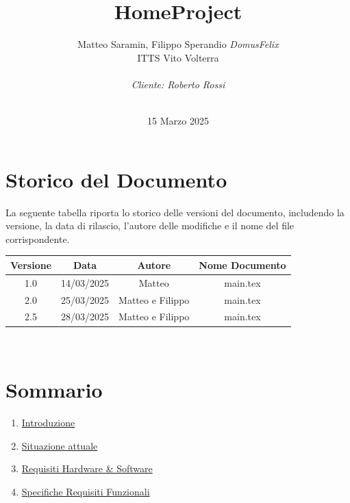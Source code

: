 \documentclass[italian, 12pt, a4paper]{article}
\title{\huge{HomeProject}}
\author{Matteo Saramin, Filippo Sperandio \textit{DomusFelix} \\ {\small ITTS Vito Volterra} \\ \\ \emph{Cliente: Roberto Rossi}}
\date{\version\\ 15 Marzo 2025}
\begin{document}
\maketitle %

\section{Storico del Documento}
La seguente tabella riporta lo storico delle versioni del documento, includendo la versione, la data di rilascio, l'autore delle modifiche e il nome del file corrispondente.

\begin{center}
    \renewcommand{\arraystretch}{1.5} %
    \begin{tabular}{|c|c|c|c|}
        \hline
        \rowcolor{violet!30}
        Versione & Data & Autore & Nome Documento \\
        \hline
        1.0 & 14/03/2025 & Matteo & main.tex \\
        \hline
        2.0&25/03/2025&Matteo e Filippo & main.tex \\
        \hline
        \hline
        2.5&28/03/2025&Matteo e Filippo&main.tex\\
        \hline
    \end{tabular}\\[4mm]
\end{center}
\vspace{15mm}
\section{Sommario}
\begin{enumerate}
    \item \hyperref[sec:introduzione]{Introduzione}
    \item \hyperref[sec:situazione]{Situazione attuale}
    \item \hyperref[sec:requisiti]{Requisiti Hardware \& Software}
    \item \hyperref[sec:requisiti2]{Specifiche Requisiti Funzionali}
\end{enumerate}
\clearpage
\end{document}
